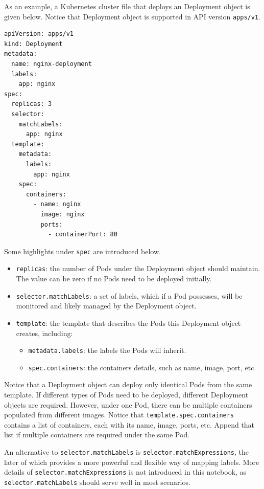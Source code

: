 As an example, a Kubernetes cluster file that deploys an Deployment object is given below. Notice that Deployment object is supported in API version \verb|apps/v1|.
\begin{lstlisting}
apiVersion: apps/v1
kind: Deployment
metadata:
  name: nginx-deployment
  labels:
    app: nginx
spec:
  replicas: 3
  selector:
    matchLabels:
      app: nginx
  template:
    metadata:
      labels:
        app: nginx
    spec:
      containers:
        - name: nginx
          image: nginx
          ports:
            - containerPort: 80
\end{lstlisting}
Some highlights under \verb|spec| are introduced below.
\begin{itemize}
	\item \verb|replicas|: the number of Pods under the Deployment object should maintain. The value can be zero if no Pods need to be deployed initially.
	\item \verb|selector.matchLabels|: a set of labels, which if a Pod possesses, will be monitored and likely managed by the Deployment object.
	\item \verb|template|: the template that describes the Pods this Deployment object creates, including:
    \begin{itemize}
      \item \verb|metadata.labels|: the labels the Pods will inherit.
      \item \verb|spec.containers|: the containers details, such as name, image, port, etc.
    \end{itemize}
\end{itemize}
Notice that a Deployment object can deploy only identical Pods from the same template. If different types of Pods need to be deployed, different Deployment objects are required. However, under one Pod, there can be multiple containers populated from different images. Notice that \texttt{template.spec.containers} contains a list of containers, each with its name, image, ports, etc. Append that list if multiple containers are required under the same Pod.

An alternative to \texttt{selector.matchLabels} is \texttt{selector.matchExpressions}, the later of which provides a more powerful and flexible way of mapping labels. More details of \texttt{selector.matchExpressions} is not introduced in this notebook, as \texttt{selector.matchLabels} should serve well in most scenarios.

